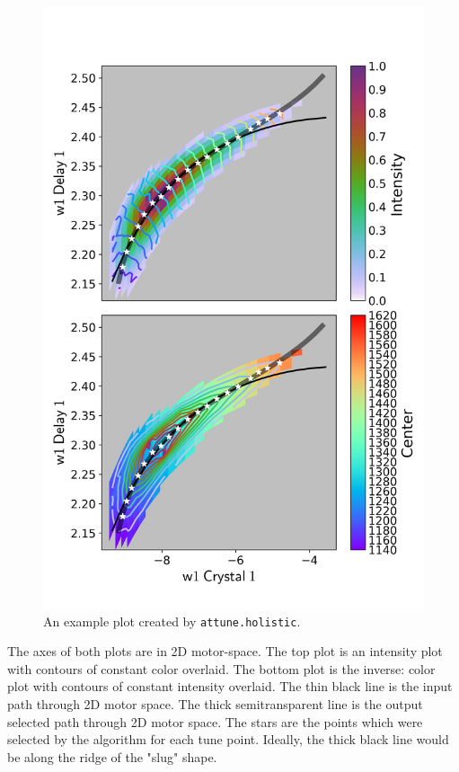 \begin{figure}
	\includegraphics[width=5in]{representation/images/holistic.png}
\caption[Holistic]{
	An example plot created by \texttt{attune.holistic}.
}
\label{rep:fig:holistic}
\end{figure}

The axes of both plots are in 2D motor-space. The top plot is an
intensity plot with contours of constant color overlaid. The bottom plot
is the inverse: color plot with contours of constant intensity overlaid.
The thin black line is the input path through 2D motor space. The thick
semitransparent line is the output selected path through 2D motor space.
The stars are the points which were selected by the algorithm for each
tune point. Ideally, the thick black line would be along the ridge of
the "slug" shape.

\clearpage
